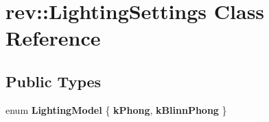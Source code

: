 \hypertarget{classrev_1_1_lighting_settings}{}\section{rev\+::Lighting\+Settings Class Reference}
\label{classrev_1_1_lighting_settings}
\subsection*{Public Types}
\begin{DoxyCompactItemize}
\item 
\mbox{\label{classrev_1_1_lighting_settings_a454685bb794cbd744f2b483fe7eda341}} 
enum {\bfseries Lighting\+Model} \{ {\bfseries k\+Phong}, 
{\bfseries k\+Blinn\+Phong}
 \}
\end{DoxyCompactItemize}
